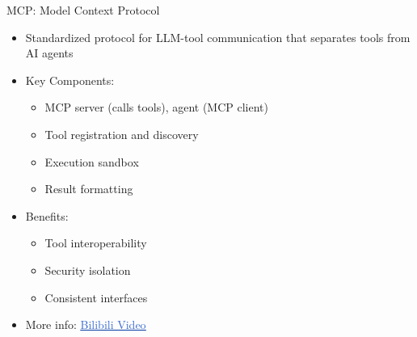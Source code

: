 \documentclass[aspectratio=169]{beamer}
\newcommand{\styhref}[2]{\href{#1}{\textcolor{highlight}{\underline{#2}}}}
\begin{document}
\begin{frame}[fragile]{MCP: Model Context Protocol}
		\begin{itemize}
			\item {\color{highlight}Standardized protocol} for LLM-tool communication that separates tools from AI agents
			\item {\color{highlight}Key Components}:
			\begin{itemize}
				\item MCP server (calls tools), agent (MCP client)
				\item Tool registration and discovery
				\item Execution sandbox
				\item Result formatting
			\end{itemize}
			\item {\color{highlight}Benefits}:
			\begin{itemize}
				\item Tool interoperability
				\item Security isolation
				\item Consistent interfaces
			\end{itemize}
			\item More info: \styhref{https://www.bilibili.com/video/BV1aeLqzUE6L/?spm_id_from=333.337.search-card.all.click&vd_source=33f55e2440bef2f106246ccd65bf1daed}{Bilibili Video}
		\end{itemize}

\end{frame}
\end{document}
